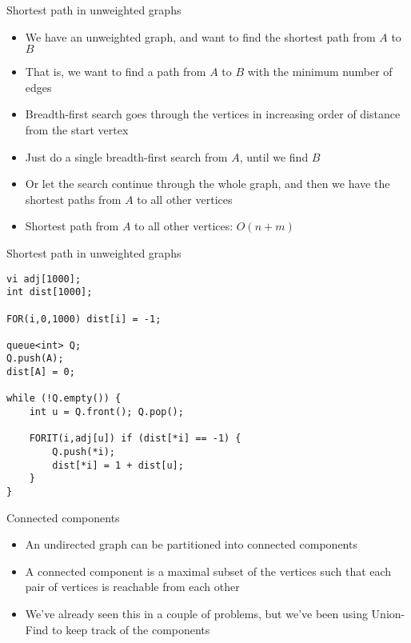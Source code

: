 \documentclass[12pt,t]{beamer}
\newcommand{\bi}{\begin{itemize}}
\newcommand{\ei}{\end{itemize}}
\begin{document}
\begin{frame}{Shortest path in unweighted graphs}
    \vspace{5pt}
    \bi
        \item We have an unweighted graph, and want to find the shortest path from $A$ to $B$
        \item That is, we want to find a path from $A$ to $B$ with the minimum number of edges
        \vspace{10pt}
        \item Breadth-first search goes through the vertices in increasing order of distance from the start vertex
        \item Just do a single breadth-first search from $A$, until we find $B$
        \vspace{5pt}
        \item Or let the search continue through the whole graph, and then we have the shortest paths from $A$ to all other vertices
        \item Shortest path from $A$ to all other vertices: $O(n + m)$
    \ei
\end{frame}

\begin{frame}[fragile]{Shortest path in unweighted graphs}

    \begin{verbatim}
vi adj[1000];
int dist[1000];

FOR(i,0,1000) dist[i] = -1;

queue<int> Q;
Q.push(A);
dist[A] = 0;

while (!Q.empty()) {
    int u = Q.front(); Q.pop();

    FORIT(i,adj[u]) if (dist[*i] == -1) {
        Q.push(*i);
        dist[*i] = 1 + dist[u];
    }
}
    \end{verbatim}

\end{frame}



\begin{frame}{Connected components}
    \vspace{30pt}
    \bi
        \item An undirected graph can be partitioned into connected components
        \item A connected component is a maximal subset of the vertices such that each pair of vertices is reachable from each other

        \vspace{10pt}

        \item We've already seen this in a couple of problems, but we've been using Union-Find to keep track of the components
    \ei
\end{frame}
\end{document}
